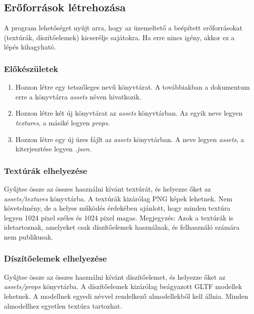 \subsection{Erőforrások létrehozása}

A program lehetőséget nyújt arra, hogy az üzemeltető a beépített erőforrásokat
(textúrák, díszítőelemek) kicserélje sajátokra. Ha erre nincs igény, akkor ez a lépés kihagyható.

\subsubsection{Előkészületek}

\begin{enumerate}
    \item Hozzon létre egy tetszőleges nevű könyvtárat. A továbbiakban a dokumentum erre a
          könyvtárra \emph{assets} néven hivatkozik.

    \item Hozzon létre két új könyvtárat az \emph{assets} könyvtárban. Az egyik neve legyen
          \emph{textures}, a másiké legyen \emph{props}.

    \item Hozzon létre egy új üres fájlt az \emph{assets} könyvtárban. A neve legyen \emph{assets},
          a kiterjesztése legyen \emph{.json}.
\end{enumerate}

\subsubsection{Textúrák elhelyezése}

Gyűjtse össze az összes használni kívánt textúrát, és helyezze őket az \emph{assets/textures}
könyvtárba. A textúrák kizárólag PNG képek lehetnek. Nem követelmény, de a helyes működés érdekében
ajánlott, hogy minden textúra legyen 1024 pixel széles és 1024 pixel magas. Megjegyzés: Azok a
textúrák is idetartoznak, amelyeket csak díszítőelemek használnak, és felhasználó számára nem
publikusak.

\subsubsection{Díszítőelemek elhelyezése}

Gyűjtse össze az összes használni kívánt díszítőelemet, és helyezze őket az \emph{assets/props}
könyvtárba. A díszítőelemek kizárólag beágyazott GLTF modellek lehetnek. A modellnek egyedi
névvel rendelkező almodellekből kell állnia. Minden almodellhez egyetlen textúra tartozhat.


